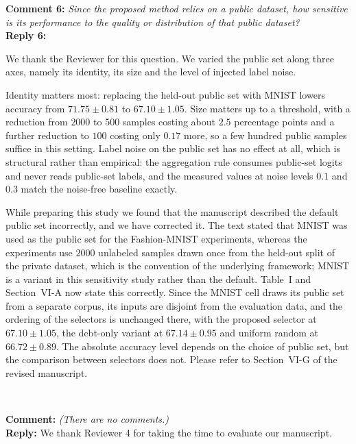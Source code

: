 \documentclass[10pt]{article}
\begin{document}
\noindent
\textbf{Comment 6:} \textit{Since the proposed method relies on a public dataset, how sensitive is its performance to the quality or distribution of that public dataset?} \\
\noindent
\textbf{Reply 6:} {We thank the Reviewer for this question. We varied the public set along three axes, namely its identity, its size and the level of injected label noise.

Identity matters most: replacing the held-out public set with MNIST lowers accuracy from $71.75 \pm 0.81$ to $67.10 \pm 1.05$. Size matters up to a threshold, with a reduction from $2000$ to $500$ samples costing about $2.5$ percentage points and a further reduction to $100$ costing only $0.17$ more, so a few hundred public samples suffice in this setting. Label noise on the public set has no effect at all, which is structural rather than empirical: the aggregation rule consumes public-set logits and never reads public-set labels, and the measured values at noise levels $0.1$ and $0.3$ match the noise-free baseline exactly.

While preparing this study we found that the manuscript described the default public set incorrectly, and we have corrected it. The text stated that MNIST was used as the public set for the Fashion-MNIST experiments, whereas the experiments use $2000$ unlabeled samples drawn once from the held-out split of the private dataset, which is the convention of the underlying framework; MNIST is a variant in this sensitivity study rather than the default. Table~I and Section~VI-A now state this correctly. Since the MNIST cell draws its public set from a separate corpus, its inputs are disjoint from the evaluation data, and the ordering of the selectors is unchanged there, with the proposed selector at $67.10 \pm 1.05$, the debt-only variant at $67.14 \pm 0.95$ and uniform random at $66.72 \pm 0.89$. The absolute accuracy level depends on the choice of public set, but the comparison between selectors does not. Please refer to Section~VI-G of the revised manuscript.}\\


\noindent
\textbf{Comment:} \textit{(There are no comments.)} \\
\noindent
\textbf{Reply:} {We thank Reviewer 4 for taking the time to evaluate our manuscript.}\\
\end{document}
